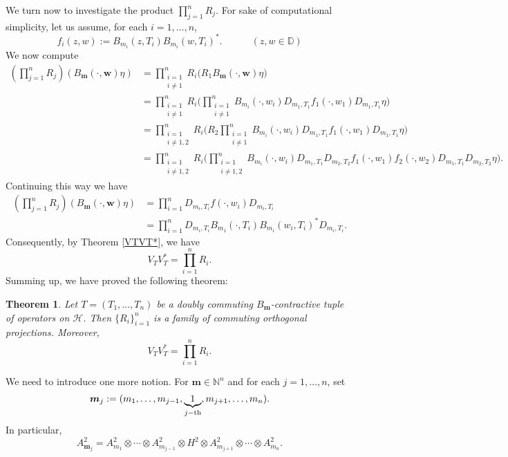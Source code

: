 \documentclass[12pt]{amsart}
\newtheorem{Theorem}{\sc Theorem}[section]
\begin{document}
We turn now to investigate the product $\prod_{j=1}^n R_j$. For sake
of computational simplicity, let us assume, for each $i = 1, \ldots,
n$,
\[f_i(z, w) := B_{m_i}(z, T_i) B_{m_i}(w, T_i)^*. \quad \quad \quad  (z, w \in {\mathbb{D}})\]
We now compute \[\begin{split}(\prod_{j=1}^n R_j)(B_{\bm{m}}(\cdot, {\bm{w}})
\eta) & = \prod_{\substack{{i=1}\\i \neq 1}}^n R_i \Big(R_1
B_{\bm{m}}(\cdot, {\bm{w}}) \eta\Big) \\ & = \prod_{\substack{{i=1}\\i \neq
1}}^n R_i \Big( \prod_{\substack{{i=1}\\i \neq 1}}^n B_{m_i}(\cdot,
w_i) D_{m_1, T_1} f_1(\cdot, w_1) D_{m_1, T_1} \eta\Big) \\ & =
\prod_{\substack{{i=1}\\i \neq 1, 2}}^n R_i \Big(R_2
\prod_{\substack{{i=1}\\i \neq 1}}^n B_{m_i}(\cdot, w_i)  D_{m_1,
T_1} f_1(\cdot, w_1) D_{m_1, T_1} \eta\Big) \\ & =
\prod_{\substack{{i=1}\\i \neq 1, 2}}^n R_i
\Big(\prod_{\substack{{i=1}\\i \neq 1, 2}}^n B_{m_i}(\cdot, w_i)
D_{m_1, T_1} D_{m_2, T_2} f_1(\cdot, w_1) f_2(\cdot, w_2) D_{m_1, T_1}
D_{m_2, T_2}\eta\Big).\end{split}\]Continuing this way we have
\[\begin{split}(\prod_{j=1}^n R_j)(B_{\bm{m}}(\cdot, {\bm{w}}) \eta) & =
\prod_{i=1}^n D_{m_i, T_i} f(\cdot, w_i) D_{m_i, T_i}\\ & =
\prod_{i=1}^n D_{m_i, T_i} B_{m_1}(\cdot, T_i) B_{m_i}(w_i, T_i)^*
D_{m_i, T_i}.\end{split}\] Consequently, by Theorem \ref{VTVT*}, we
have \[V_T V_T^* = \prod_{i=1}^n R_i.\]Summing up, we have proved
the following theorem:

\begin{Theorem}\label{VR}
Let $T = (T_1, \ldots, T_n)$ be a doubly commuting
$B_{\bm{m}}$-contractive tuple of operators on ${\mathcal{H}}$. Then
$\{R_i\}_{i=1}^n$ is a family of commuting orthogonal projections.
Moreover, \[V_T V_T^* = \prod_{i=1}^n R_i.\]
\end{Theorem}

We need to introduce one more notion. For ${\bm{m}} \in \mathbb{N}^n$ and
for each $j = 1, \ldots, n$, set \[{\bm{m}}_j : = (m_1, \ldots, m_{j-1},
\underbrace{1}\limits_{j-\textup{th}}, m_{j+1}, \ldots, m_n).\]In particular, \[A^2_{{\bm{m}}_j} = 
A^2_{m_1} \otimes \cdots \otimes A^2_{m_{j-1}} \otimes H^2 \otimes A^2_{m_{j+1}} \otimes \cdots \otimes 
A^2_{m_n}.\]
\end{document}
